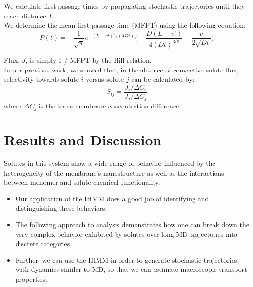 \documentclass{article}
\begin{document}
  \noindent We calculate first passage times by propagating stochastic trajectories until they
  reach distance $L$. \\
  
  We determine the mean first passage time (MFPT) using the following equation:~\cite{cussler_diffusion:_2009}
  \begin{equation}
  P(t) = -\frac{1}{\sqrt{\pi}}e^{-(L - vt)^2 / (4Dt)}\bigg(-\frac{D(L - vt)}{4(Dt)^{3/2}} - \frac{v}{2\sqrt{Dt}}\bigg)
  \label{eqn:passage_times}
  \end{equation}
  
  \noindent Flux, $J$, is simply 1 / MFPT by the Hill relation.~\cite{hill_free_1989} \\
  
  In our previous work, we showed that, in the absence of convective solute flux, selectivity
  towards solute $i$ versus solute $j$ can be calculated by:  
  \begin{equation}
  S_{ij} = \frac{J_i / \Delta C_i}{J_j / \Delta C_j}
  \label{eqn:selectivity}
  \end{equation}
  where $\Delta C_j$ is the trans-membrane concentration difference.

  \section{Results and Discussion}
  
  Solutes in this system show a wide range of behavior influenced by the 
  heterogeneity of the membrane's nanostructure as well as the interactions 
  between monomer and solute chemical functionality. 
  \begin{itemize}  
  	\item Our application of the IHMM does a good job of identifying and
  	distinguishing these behaviors.   	
  	\item The following approach to analysis demonstrates how one can break 
  	down the very complex behavior exhibited by solutes over long MD trajectories 
  	into discrete categories.
	\item Further, we can use the IHMM in order to generate stochastic trajectories,
	with dynamics similar to MD, so that we can estimate macroscopic transport
	properties.
  \end{itemize}  	
\end{document}
